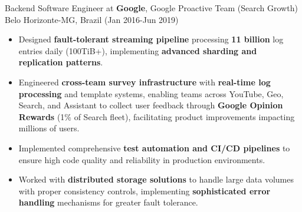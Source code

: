 
\normalsize{Backend Software Engineer at \textbf{Google}, Google Proactive Team (Search Growth)}\\
        \scriptsize{Belo Horizonte-MG, Brazil (Jan 2016-Jun 2019)}
\begin{itemize}
    \item \scriptsize{Designed \textbf{fault-tolerant streaming pipeline} processing \textbf{11 billion} log entries daily (100TiB+), implementing \textbf{advanced sharding and replication patterns}.}

    \item \scriptsize{Engineered \textbf{cross-team survey infrastructure} with \textbf{real-time log processing} and template systems, enabling teams across YouTube, Geo, Search, and Assistant to collect user feedback through \textbf{Google Opinion Rewards} (1\% of Search fleet), facilitating product improvements impacting millions of users.}
    
    \item \scriptsize{Implemented comprehensive \textbf{test automation and CI/CD pipelines} to ensure high code quality and reliability in production environments.}

    \item \scriptsize{Worked with \textbf{distributed storage solutions} to handle large data volumes with proper consistency controls, implementing \textbf{sophisticated error handling} mechanisms for greater fault tolerance.}

\end{itemize}